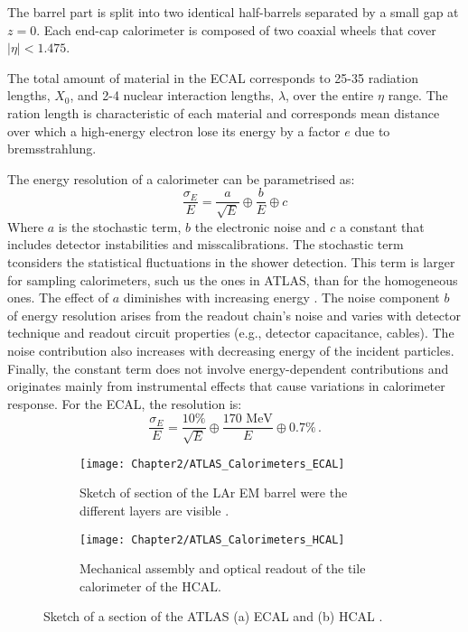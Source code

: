 The barrel part is split into two identical half-barrels separated by a small gap at $z=0$. 
Each end-cap calorimeter is composed of two coaxial wheels that cover $|\eta|<1.475$. 

The total amount of material in the ECAL corresponds to 25-35 radiation lengths, $X_0$, and 2-4 nuclear interaction 
lengths, $\lambda$, over the entire $\eta$ range. The ration length is characteristic of each material and corresponds mean distance 
over which a high-energy electron lose its energy by a factor $e$ due to bremsstrahlung. %

The energy resolution of a calorimeter can be parametrised as:
\begin{equation*}
	\frac{\sigma_E}{E}= \frac{a}{\sqrt{E}} \oplus \frac{b}{E} \oplus c 
\end{equation*}
Where $a$ is the stochastic term, $b$ the electronic noise and $c$ a constant that includes detector instabilities and
misscalibrations. The stochastic term tconsiders the statistical fluctuations in the shower detection. This term
is larger for sampling calorimeters, such us the ones in ATLAS, than for the homogeneous ones. The effect of $a$ diminishes with
increasing energy \cite{TarekAbouelfadlMohamed2020}. The noise component $b$ of energy resolution arises from the readout chain's
noise and varies with detector technique and readout circuit properties (e.g., detector capacitance, cables). The noise contribution 
also increases with decreasing energy of the incident particles. Finally, the constant term does not involve energy-dependent 
contributions and originates mainly from instrumental effects that cause variations in calorimeter response.
For the ECAL, the resolution is:
\begin{equation*}
	\frac{\sigma_E}{E} = \frac{10\%}{\sqrt{E}} \oplus \frac{170\textrm{ MeV}}{E} \oplus 0.7 \% \,.
\end{equation*}


\begin{figure}[!tbp]
  \begin{subfigure}[b]{0.49\textwidth}
    	\texttt{[image: Chapter2/ATLAS\_Calorimeters\_ECAL]}
	\caption{Sketch of section of the LAr EM barrel were the different layers are visible \cite{ATLAS:2008xda}.}
    	\label{fig:Chap2:ATLAS:ECal}
  \end{subfigure}
  \hfill
  \begin{subfigure}[b]{0.49\textwidth}
    	\texttt{[image: Chapter2/ATLAS\_Calorimeters\_HCAL]}
	\caption{Mechanical assembly and optical readout of the tile calorimeter of the HCAL.}
    	\label{fig:Chap2:ATLAS:HCal}
  \end{subfigure}
  \caption{Sketch of a section of the ATLAS (a) ECAL and (b) HCAL \cite{ATLAS:2008xda}.}
\end{figure}




